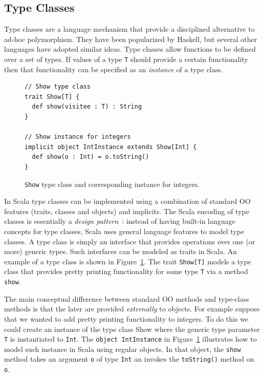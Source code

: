 \documentclass[preprint]{sigplanconf}
\begin{document}
\subsection{Type Classes}
\label{sec:type-classes}

Type classes are a language mechanism that provide a disciplined
alternative to ad-hoc polymorphism. They have been popularized by
Haskell, but several other languages have adopted similar ideas.  Type
classes allow functions to be defined over a set of types.  If values
of a type \lstinline{T} should provide a certain functionality then that
functionality can be specified as an \emph{instance} of a type class.

\begin{figure}
\begin{lstlisting}
// Show type class
trait Show[T] {
  def show(visitee : T) : String
}

// Show instance for integers
implicit object IntInstance extends Show[Int] {
  def show(o : Int) = o.toString()
}
\end{lstlisting}
\caption{\lstinline{Show} type class and corresponding instance for
  integers.}
\label{fig:showtc}
\end{figure}

In Scala type classes can be implemented using a combination of
standard OO features (traits, classes and objects) and implicits.
The Scala encoding of type classes is essentially a \emph{design pattern}~\cite{}:
instead of having built-in language concepts for type classes, Scala
uses general language features to model type classes.
A type class is simply an interface that provides operations
over one (or more) generic types. Such interfaces can be modeled
as traits in Scala. An example of a type class is shown in
Figure~\ref{fig:showtc}. The trait \lstinline{Show[T]} models a type
class that provides pretty printing functionality for some type
\lstinline{T} via a method \lstinline{show}.

The main conceptual difference between standard OO methods and
type-class methods is that the later are provided \emph{externally} to
objects. For example suppose that we wanted to add pretty printing
functionality to integers. To do this we could create an instance of
the type class Show where the generic type parameter \lstinline{T} is
instantiated to \lstinline{Int}. The \lstinline{object IntInstance} in
Figure~\ref{fig:showtc} illustrates how to model such instance in
Scala using regular objects. In that object, the \lstinline{show}
method takes an argument \lstinline{o} of type \lstinline{Int} an
invokes the \lstinline{toString()} method on \lstinline{o}.
\end{document}
